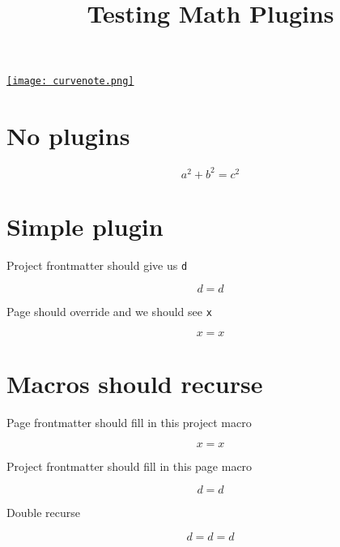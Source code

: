 \documentclass{article}
\title{Testing Math Plugins}
\author{}
\date{\displaydate{articleDate}}
\newcommand{\three}{d}
\newcommand{\one}{x}
\newcommand{\five}{x = \one}
\newcommand{\six}{d = \three}
\newcommand{\seven}{d = \six}
\newcommand{\logo}{
  \href{https://curvenote.com}{\texttt{[image: curvenote.png]}}
}
\begin{document}
\maketitle
\begin{center}\logo\end{center}


\section{No plugins}

\begin{equation}
a^2 + b^2 = c^2
\end{equation}

\section{Simple plugin}

Project frontmatter should give us \texttt{d}

\begin{equation}
d = \three
\end{equation}

Page should override and we should see \texttt{x}

\begin{equation}
x = \one
\end{equation}

\section{Macros should recurse}

Page frontmatter should fill in this project macro

\begin{equation}
\five
\end{equation}

Project frontmatter should fill in this page macro

\begin{equation}
\six
\end{equation}

Double recurse

\begin{equation}
\seven
\end{equation}
\end{document}
